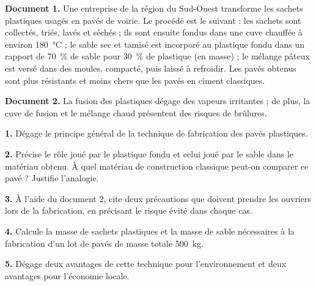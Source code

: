 \documentclass[11pt]{article}
\begin{document}
\begin{exercice}
\textbf{Document 1.} Une entreprise de la région du Sud-Ouest transforme les sachets plastiques usagés en pavés de voirie. Le procédé est le suivant : les sachets sont collectés, triés, lavés et séchés ; ils sont ensuite fondus dans une cuve chauffée à environ \SI{180}{\celsius} ; le sable sec et tamisé est incorporé au plastique fondu dans un rapport de \SI{70}{\%} de sable pour \SI{30}{\%} de plastique (en masse) ; le mélange pâteux est versé dans des moules, compacté, puis laissé à refroidir. Les pavés obtenus sont plus résistants et moins chers que les pavés en ciment classiques.

\textbf{Document 2.} La fusion des plastiques dégage des vapeurs irritantes ; de plus, la cuve de fusion et le mélange chaud présentent des risques de brûlures.

\textbf{1.} Dégage le principe général de la technique de fabrication des pavés plastiques.

\textbf{2.} Précise le rôle joué par le plastique fondu et celui joué par le sable dans le matériau obtenu. À quel matériau de construction classique peut-on comparer ce pavé ? Justifie l'analogie.

\textbf{3.} À l'aide du document 2, cite deux précautions que doivent prendre les ouvriers lors de la fabrication, en précisant le risque évité dans chaque cas.

\textbf{4.} Calcule la masse de sachets plastiques et la masse de sable nécessaires à la fabrication d'un lot de pavés de masse totale \SI{500}{kg}.

\textbf{5.} Dégage deux avantages de cette technique pour l'environnement et deux avantages pour l'économie locale.
\end{exercice}
\end{document}
